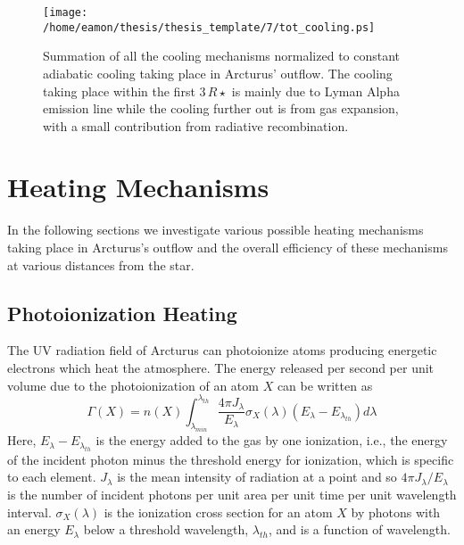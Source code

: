 \begin{figure}[!ht]
\centering 
         \texttt{[image: /home/eamon/thesis/thesis\_template/7/tot\_cooling.ps]}
\caption[Summation of all cooling mechanisms]{Summation of all the cooling mechanisms normalized to constant adiabatic cooling taking place in Arcturus' outflow. The cooling taking place within the first $3\,R\star$ is mainly due to Lyman Alpha emission line while the cooling further out is from gas expansion, with a small contribution from radiative recombination.}
\label{fig:7.2}
\end{figure}

\section{Heating Mechanisms}\label{sec:4}
In the following sections we investigate various possible heating mechanisms taking place in Arcturus's outflow and the  overall efficiency of these mechanisms at various distances from the star. 

\subsection{Photoionization Heating}\label{sec:4.1}
The UV radiation field of Arcturus can photoionize atoms producing energetic electrons which heat the atmosphere. The energy released per second per unit volume due to the photoionization of an atom $X$ can be written as
\begin{equation}\label{eq:7.20}
\Gamma (X) = n(X)\int ^{\lambda _{th}}_{\lambda _{min}}\frac{4\pi J_{\lambda}}{E _{\lambda}}\sigma _{X}(\lambda)(E_{\lambda} - E_{\lambda _{th}})d\lambda
\end{equation}
Here, $E_{\lambda} - E_{\lambda _{th}}$ is the energy added to the gas by one ionization, i.e., the energy of the incident photon minus the threshold energy for ionization, which is specific to each element. $J_{\lambda}$ is the 
mean intensity of radiation at a point and so $4\pi J_{\lambda}/E _{\lambda}$ is the number of incident photons per unit area per unit time per unit wavelength interval. $\sigma _{X}(\lambda)$ is the ionization cross section for an atom $X$ by photons with an energy $E_{\lambda}$ below a threshold wavelength, $\lambda _{th}$, and is a function of wavelength.

